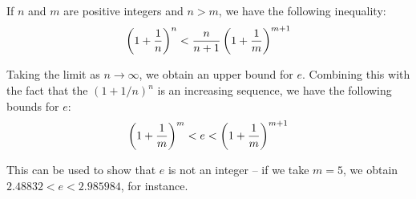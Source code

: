 \documentclass[12pt]{article}
\begin{document}
If $n$ and $m$ are positive integers and $n > m$, we have
the following inequality:
\[ \left( 1 + {1 \over n} \right)^n < {n \over n+1} \left( 1
+ {1 \over m} \right)^{m+1} \]

Taking the limit as $n \to \infty$, we obtain an upper bound for $e$.
Combining this with the fact that the $(1 + 1/n)^n$ is an increasing
sequence, we have the following bounds for $e$:
\[ \left( 1 + {1 \over m} \right)^m < e < \left( 1
+ {1 \over m} \right)^{m+1}\]

This can be used to show that $e$ is not an integer -- if we take
$m = 5$, we obtain $2.48832 < e < 2.985984$, for instance.
\end{document}

